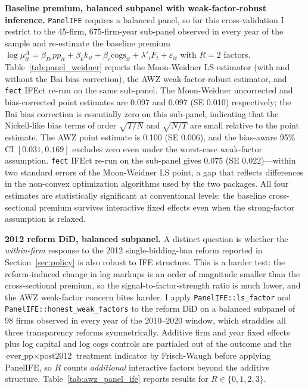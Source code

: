 \documentclass[11pt]{article}
\begin{document}


{\sloppy
\textbf{Baseline premium, balanced subpanel with weak-factor-robust inference.} \texttt{PanelIFE} requires a balanced panel, so for this cross-validation I restrict to the 45-firm, 675-firm-year sub-panel observed in every year of the sample and re-estimate the baseline premium $\log \mu^A_{it} = \beta_D\, pp_{it} + \beta_k k_{it} + \beta_c \text{cogs}_{it} + \lambda'_i F_t + \varepsilon_{it}$ with $R = 2$ factors. Table~\ref{tab:panel_weidner} reports the Moon-Weidner LS estimator (with and without the Bai bias correction), the AWZ weak-factor-robust estimator, and \texttt{fect} IFEct re-run on the same sub-panel. The Moon-Weidner uncorrected and bias-corrected point estimates are 0.097 and 0.097 (SE 0.010) respectively; the Bai bias correction is essentially zero on this sub-panel, indicating that the Nickell-like bias terms of order $\sqrt{T/N}$ and $\sqrt{N/T}$ are small relative to the point estimate. The AWZ point estimate is 0.100 (SE 0.006), and the bias-aware 95\% CI $[0.031, 0.169]$ excludes zero even under the worst-case weak-factor assumption. \texttt{fect} IFEct re-run on the sub-panel gives 0.075 (SE 0.022)---within two standard errors of the Moon-Weidner LS point, a gap that reflects differences in the non-convex optimization algorithms used by the two packages. All four estimates are statistically significant at conventional levels: the baseline cross-sectional premium survives interactive fixed effects even when the strong-factor assumption is relaxed.
\par}



\textbf{2012 reform DiD, balanced subpanel.} A distinct question is whether the \emph{within-firm} response to the 2012 single-bidding-ban reform reported in Section~\ref{sec:policy} is also robust to IFE structure. This is a harder test: the reform-induced change in log markups is an order of magnitude smaller than the cross-sectional premium, so the signal-to-factor-strength ratio is much lower, and the AWZ weak-factor concern bites harder. I apply \texttt{PanelIFE::ls\_factor} and \texttt{PanelIFE::honest\_weak\_factors} to the reform DiD on a balanced subpanel of 98 firms observed in every year of the 2010--2020 window, which straddles all three transparency reforms symmetrically. Additive firm and year fixed effects plus log capital and log cogs controls are partialed out of the outcome and the $\text{ever\_pp} \times \text{post2012}$ treatment indicator by Frisch-Waugh before applying PanelIFE, so $R$ counts \emph{additional} interactive factors beyond the additive structure. Table~\ref{tab:awz_panel_ife} reports results for $R \in \{0, 1, 2, 3\}$.
\end{document}

